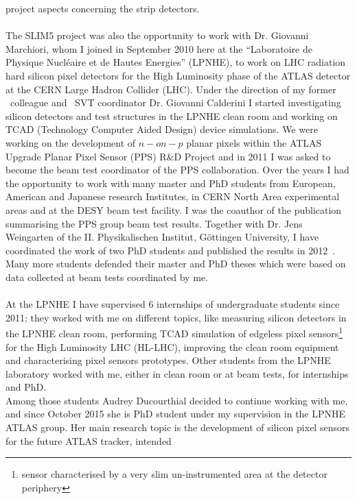 project aspects concerning the strip detectors. 
\\
\\
The SLIM5 project was also the opportunity to work with Dr. Giovanni Marchiori, whom I  joined in 
September 2010 here 
at the ``Laboratoire de Physique Nucl\'eaire et de Hautes Energies'' (LPNHE), to work on LHC
radiation hard silicon pixel detectors for the High Luminosity phase of the  ATLAS detector at the CERN  
Large Hadron Collider (LHC). Under the direction of my former \babar\ colleague and \babar\ SVT coordinator
Dr. Giovanni Calderini I started investigating silicon detectors and test structures in the LPNHE clean room 
  and working on TCAD (Technology Computer Aided Design) device simulations.
We were working on the development of $n-on-p$ planar pixels within the ATLAS Upgrade Planar Pixel 
Sensor (PPS) R\&D Project and in 2011 I was asked to become the beam test coordinator of the PPS 
collaboration. Over the years I had the opportunity to work with many master and PhD students from
 European, American and Japanese research Institutes, in CERN North Area experimental areas and at the DESY 
 beam test facility. 
I was the coauthor of the publication summarising  the PPS group beam test 
results. Together with Dr. Jens Weingarten of the  II. Physikalischen Institut, G\"ottingen University,  
I have coordinated the work of two PhD students and published the results in 2012~\cite{1748-0221-7-10-P10028}. \\
Many more students defended their master and PhD theses which were based on data collected at 
beam tests coordinated by me.
\\ \\
At the LPNHE I have supervised  6 internships of undergraduate students since 2011; 
they worked with me on different topics, like measuring silicon detectors
 in the LPNHE clean room, performing TCAD 
simulation of edgeless pixel sensors\footnote{sensor characterised by a very slim un-instrumented area at 
the detector periphery}~\cite{bib:nim2012} for the 
High Luminosity LHC (HL-LHC), improving the clean room equipment  and characterising pixel sensors 
prototypes. Other students from the LPNHE laboratory worked with me, either
in clean room or at beam tests, for internships and PhD.
\\
Among those students Audrey Ducourthial decided to continue working with me, and since October 2015 she is 
 PhD student under my supervision in the LPNHE ATLAS group. 
Her main research topic is the development of silicon pixel sensors for the future ATLAS tracker, intended 
